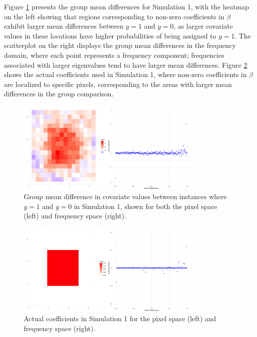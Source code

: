 \documentclass[12pt]{article}
\begin{document}
Figure \ref{fig:group_diff1} presents the group mean differences for Simulation 1, with the heatmap on the left showing that regions corresponding to non-zero coefficients in \( \beta \) exhibit larger mean differences between \( y = 1 \) and \( y = 0 \), as larger covariate values in these locations have higher probabilities of being assigned to \( y = 1 \). The scatterplot on the right displays the group mean differences in the frequency domain, where each point represents a frequency component; frequencies associated with larger eigenvalues tend to have larger mean differences. Figure \ref{fig:coefs_sim1} shows the actual coefficients used in Simulation 1, where non-zero coefficients in \( \beta \) are localized to specific pixels, corresponding to the areas with larger mean differences in the group comparison.

\begin{figure}[h!]
	\centering
  \includegraphics[width=0.8\textwidth, height=0.35\textwidth]{group_mean_diff_sim1.png}
	\caption{Group mean difference in covariate values between instances where \( y = 1 \) and \( y = 0 \) in Simulation
		1, shown for both the pixel space (left) and frequency space (right).}
	\label{fig:group_diff1}
\end{figure}

\begin{figure}[h!]
	\centering
	\includegraphics[width=0.8\textwidth, height=0.35\textwidth]{actual_coefs_sim1.png}
	\caption{Actual coefficients in Simulation 1 for the pixel space (left) and frequency space (right).}
	\label{fig:coefs_sim1}
\end{figure}
\end{document}
